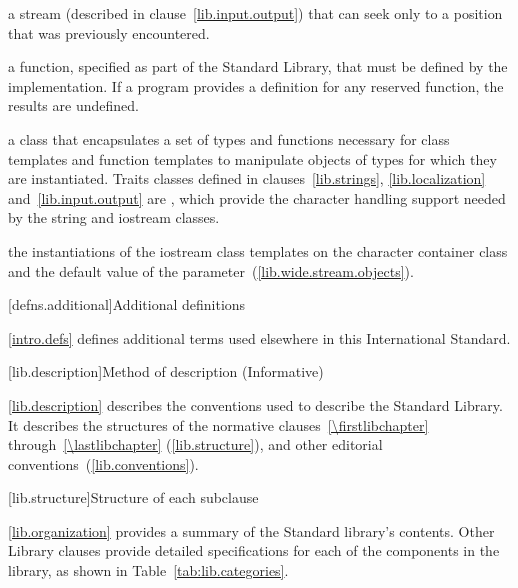 %
a stream (described in clause~\ref{lib.input.output}) that can seek only to a position that was
previously encountered.

%
a function, specified as part of the \Cpp Standard Library, that must be defined by the
implementation.
If a \Cpp program provides a definition for any reserved function, the results are undefined.%

%
a class that encapsulates a set of types and functions necessary for class templates and
function templates to manipulate objects of types for which they are instantiated.
Traits classes defined in clauses~\ref{lib.strings}, \ref{lib.localization} and~\ref{lib.input.output} are
, which provide the character handling support needed by the string and
iostream classes.

the instantiations of the iostream class templates on the character container
class  and the default value of the 
parameter~(\ref{lib.wide.stream.objects}).

[defns.additional]{Additional definitions}

\pnum
\ref{intro.defs} defines additional terms used elsewhere in this International Standard.

[lib.description]{Method of description (Informative)}

\pnum
\ref{lib.description} describes the conventions used to describe the \Cpp Standard
Library. It describes the structures of the normative
clauses~\ref{\firstlibchapter} through~\ref{\lastlibchapter} (\ref{lib.structure}),
and other editorial conventions~(\ref{lib.conventions}).

[lib.structure]{Structure of each subclause}

\pnum
\ref{lib.organization} provides a summary of the \Cpp Standard library's
contents. Other Library clauses provide detailed specifications for each
of the components in the library, as shown in Table~\ref{tab:lib.categories}.

